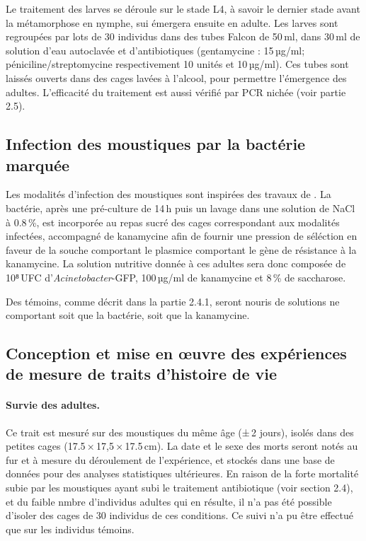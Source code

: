 Le traitement des larves se déroule sur le stade L4, à savoir le dernier stade avant la métamorphose en nymphe, sui émergera ensuite en adulte.
Les larves sont regroupées par lots de 30 individus dans des tubes Falcon de 50\,ml, dans 30\,ml de solution d'eau autoclavée et d'antibiotiques (gentamycine : 15\,µg/ml; péniciline/streptomycine respectivement 10 unités et 10\,µg/ml).
Ces tubes sont laissés ouverts dans des cages lavées à l'alcool, pour permettre l'émergence des adultes.
L'efficacité du traitement est aussi vérifié par PCR nichée (voir partie 2.5).


\subsection{Infection des moustiques par la bactérie marquée}

Les modalités d'infection des moustiques sont inspirées des travaux de \textcite{bahia2014}.
La bactérie, après une pré-culture de 14\,h puis un lavage dans une solution de NaCl à 0.8\,\%, est incorporée au repas sucré des cages correspondant aux modalités infectées, accompagné de kanamycine afin de fournir une pression de séléction en faveur de la souche comportant le plasmice comportant le gène de résistance à la kanamycine.
La solution nutritive donnée à ces adultes sera donc composée de 10⁸\,UFC d'\textit{Acinetobacter}-GFP, 100\,µg/ml de kanamycine et 8\,\% de saccharose.

Des témoins, comme décrit dans la partie 2.4.1, seront nouris de solutions ne comportant soit que la bactérie, soit que la kanamycine.

\subsection{Conception et mise en \oe{}uvre des expériences de mesure de traits d'histoire de vie}


\paragraph{Survie des adultes.} Ce trait est mesuré sur des moustiques du même âge (±\,2 jours), isolés dans des petites cages (17.5\,×\,17,5\,×\,17.5\,cm). La date et le sexe des morts seront notés au fur et à mesure du déroulement de l'expérience, et stockés dans une base de données pour des analyses statistiques ultérieures.
En raison de la forte mortalité subie par les moustiques ayant subi le traitement antibiotique (voir section 2.4), et du faible nmbre d'individus adultes qui en résulte, il n'a pas été possible d'isoler des cages de 30 individus de ces conditions.
Ce suivi n'a pu être effectué que sur les individus témoins.

